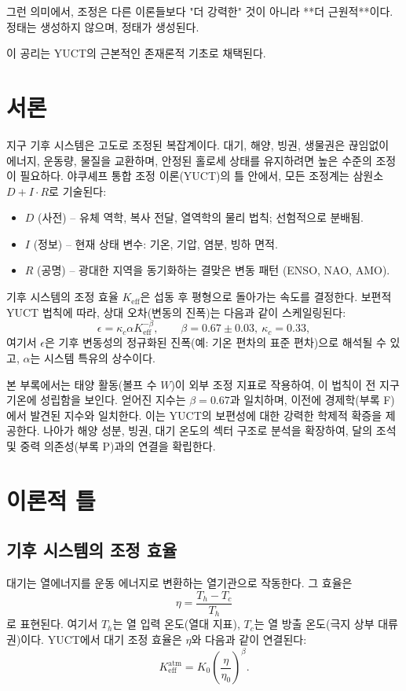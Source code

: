 \documentclass[11pt,a4paper]{article}
\newcommand{\Keff}{K_{\mathrm{eff}}}
\newcommand{\kappac}{\kappa_c}
\newcommand{\be}{\beta}
\begin{document}
	그런 의미에서, 조정은 다른 이론들보다 "더 강력한" 것이 아니라 **더 근원적**이다.
	정태는 생성하지 않으며, 정태가 생성된다.
	
	이 공리는 YUCT의 근본적인 존재론적 기초로 채택된다.
	
	\section{서론}
	
	지구 기후 시스템은 고도로 조정된 복잡계이다. 대기, 해양, 빙권, 생물권은 끊임없이 에너지, 운동량, 물질을 교환하며, 안정된 홀로세 상태를 유지하려면 높은 수준의 조정이 필요하다. 야쿠셰프 통합 조정 이론(YUCT)의 틀 안에서, 모든 조정계는 삼원소 $D + I \cdot R$로 기술된다:
	
	\begin{itemize}
		\item $D$ (사전) – 유체 역학, 복사 전달, 열역학의 물리 법칙; 선험적으로 분배됨.
		\item $I$ (정보) – 현재 상태 변수: 기온, 기압, 염분, 빙하 면적.
		\item $R$ (공명) – 광대한 지역을 동기화하는 결맞은 변동 패턴 (ENSO, NAO, AMO).
	\end{itemize}
	
	기후 시스템의 조정 효율 $\Keff$은 섭동 후 평형으로 돌아가는 속도를 결정한다. 보편적 YUCT 법칙에 따라, 상대 오차(변동의 진폭)는 다음과 같이 스케일링된다:
	\[
	\epsilon = \kappac \alpha \Keff^{-\be}, \qquad \be = 0.67 \pm 0.03,\ \kappac = 0.33,
	\]
	여기서 $\epsilon$은 기후 변동성의 정규화된 진폭(예: 기온 편차의 표준 편차)으로 해석될 수 있고, $\alpha$는 시스템 특유의 상수이다.
	
	본 부록에서는 태양 활동(볼프 수 $W$)이 외부 조정 지표로 작용하여, 이 법칙이 전 지구 기온에 성립함을 보인다. 얻어진 지수는 $\be = 0.67$과 일치하며, 이전에 경제학(부록 F)에서 발견된 지수와 일치한다. 이는 YUCT의 보편성에 대한 강력한 학제적 확증을 제공한다. 나아가 해양 성분, 빙권, 대기 온도의 섹터 구조로 분석을 확장하여, 달의 조석 및 중력 의존성(부록 P)과의 연결을 확립한다.
	
	\section{이론적 틀}
	
	\subsection{기후 시스템의 조정 효율}
	
	대기는 열에너지를 운동 에너지로 변환하는 열기관으로 작동한다. 그 효율은
	\[
	\eta = \frac{T_h - T_c}{T_h}
	\]
	로 표현된다. 여기서 $T_h$는 열 입력 온도(열대 지표), $T_c$는 열 방출 온도(극지 상부 대류권)이다. YUCT에서 대기 조정 효율은 $\eta$와 다음과 같이 연결된다:
	\[
	\Keff^{\text{atm}} = K_0 \left( \frac{\eta}{\eta_0} \right)^{\be}.
	\]
	
\end{document}
